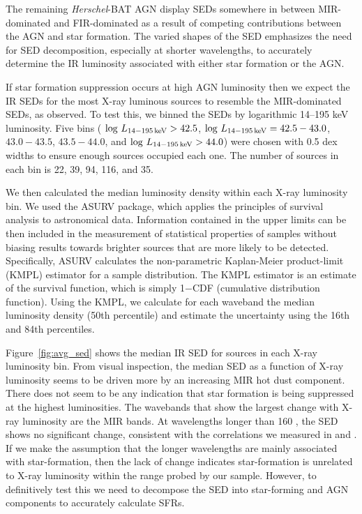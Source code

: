\documentclass[fleqn, usenatbib]{mnras}
\newcommand{\herschel}{\emph{Herschel}}
\begin{document}
The remaining \herschel-BAT AGN display SEDs somewhere in between MIR-dominated and FIR-dominated as a result of competing contributions between the AGN and star formation. The varied shapes of the SED emphasizes the need for SED decomposition, especially at shorter wavelengths, to accurately determine the IR luminosity associated with either star formation or the AGN. 

If star formation suppression occurs at high AGN luminosity then we expect the IR SEDs for the most X-ray luminous sources to resemble the MIR-dominated SEDs, as \citet{Barger:2015ly} observed. To test this, we binned the SEDs by logarithmic 14--195 keV luminosity. Five bins ( $\log\,L_{\rm 14-195\,keV} > 42.5$, $\log\,L_{\rm 14-195\,keV} = 42.5-43.0$, $43.0-43.5$, $43.5-44.0$, and $\log\,L_{\rm 14-195\,keV} > 44.0$) were chosen with 0.5 dex widths to ensure enough sources occupied each one. The number of sources in each bin is 22, 39, 94, 116, and 35. 

We then calculated the median luminosity density within each X-ray luminosity bin. We used the ASURV \citep{Feigelson:1985lr} package, which applies the principles of survival analysis to astronomical data. Information contained in the upper limits can be then included in the measurement of statistical properties of samples without biasing results towards brighter sources that are more likely to be detected. Specifically, ASURV calculates the non-parametric Kaplan-Meier product-limit (KMPL) estimator for a sample distribution. The KMPL estimator is an estimate of the survival function, which is simply 1$-$CDF (cumulative distribution function). Using the KMPL, we calculate for each waveband the median luminosity density (50th percentile) and estimate the uncertainty using the 16th and 84th percentiles. 

Figure~\ref{fig:avg_sed} shows the median IR SED for sources in each X-ray luminosity bin. From visual inspection, the median SED as a function of X-ray luminosity seems to be driven more by an increasing MIR hot dust component. There does not seem to be any indication that star formation is being suppressed at the highest luminosities. The wavebands that show the largest change with X-ray luminosity are the MIR bands. At wavelengths longer than 160 \micron, the SED shows no significant change, consistent with the correlations we measured in \citet{Melendez:2014yu} and \citet{Shimizu:2016qy}. If we make the assumption that the longer wavelengths are mainly associated with star-formation, then the lack of change indicates star-formation is unrelated to X-ray luminosity within the range probed by our sample. However, to definitively test this we need to decompose the SED into star-forming and AGN components to accurately calculate SFRs.
\end{document}
